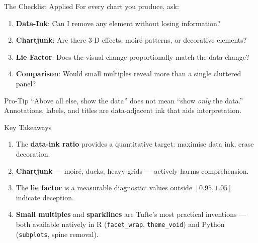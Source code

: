 \documentclass[10pt]{beamer}
\begin{document}
\begin{frame}{The Checklist Applied}
  For every chart you produce, ask:
  \begin{enumerate}
    \item \textbf{Data-Ink}: Can I remove any element without losing
          information?
    \item \textbf{Chartjunk}: Are there 3-D effects, moir\'{e} patterns,
          or decorative elements?
    \item \textbf{Lie Factor}: Does the visual change proportionally
          match the data change?
    \item \textbf{Comparison}: Would small multiples reveal more than
          a single cluttered panel?
  \end{enumerate}

  \begin{alertblock}{Pro-Tip}
    ``Above all else, show the data'' does not mean ``show
    \emph{only} the data.'' Annotations, labels, and titles are
    data-adjacent ink that aids interpretation.
  \end{alertblock}
\end{frame}

\begin{frame}{Key Takeaways}
  \begin{enumerate}
    \item The \textbf{data-ink ratio} provides a quantitative target:
          maximise data ink, erase decoration.
    \item \textbf{Chartjunk} --- moir\'{e}, ducks, heavy grids ---
          actively harms comprehension.
    \item The \textbf{lie factor} is a measurable diagnostic: values
          outside $[0.95, 1.05]$ indicate deception.
    \item \textbf{Small multiples} and \textbf{sparklines} are Tufte's
          most practical inventions --- both available natively in
          R (\texttt{facet\_wrap}, \texttt{theme\_void}) and Python
          (\texttt{subplots}, spine removal).
  \end{enumerate}
\end{frame}
\end{document}
